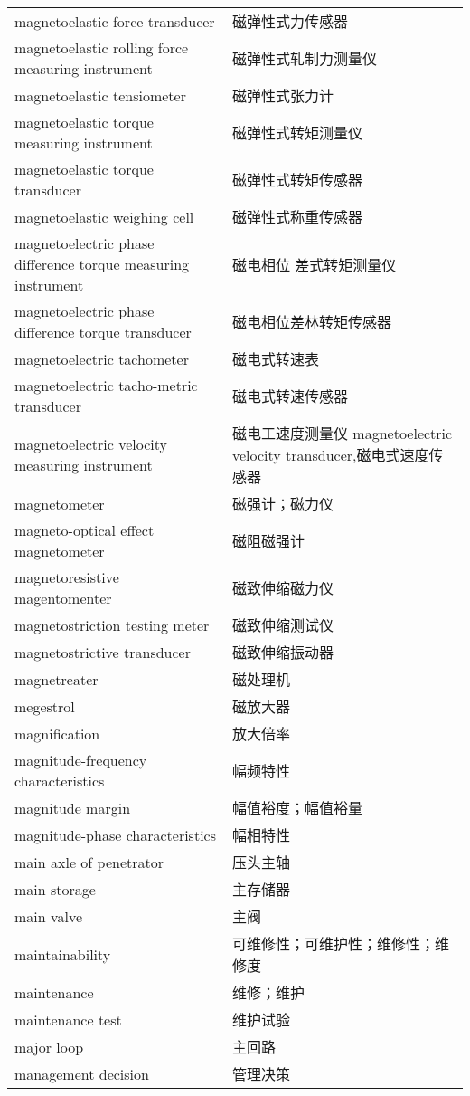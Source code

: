 \documentclass[
]{article}
\begin{document}
\begin{longtable}[]{@{}ll@{}}
magnetoelastic force transducer & 磁弹性式力传感器 \\
magnetoelastic rolling force measuring instrument &
磁弹性式轧制力测量仪 \\
magnetoelastic tensiometer & 磁弹性式张力计 \\
magnetoelastic torque measuring instrument & 磁弹性式转矩测量仪 \\
magnetoelastic torque transducer & 磁弹性式转矩传感器 \\
magnetoelastic weighing cell & 磁弹性式称重传感器 \\
magnetoelectric phase difference torque measuring instrument & 磁电相位
差式转矩测量仪 \\
magnetoelectric phase difference torque transducer &
磁电相位差林转矩传感器 \\
magnetoelectric tachometer & 磁电式转速表 \\
magnetoelectric tacho-metric transducer & 磁电式转速传感器 \\
magnetoelectric velocity measuring instrument & 磁电工速度测量仪
magnetoelectric velocity transducer,磁电式速度传感器 \\
magnetometer & 磁强计；磁力仪 \\
magneto-optical effect magnetometer & 磁阻磁强计 \\
magnetoresistive magentomenter & 磁致伸缩磁力仪 \\
magnetostriction testing meter & 磁致伸缩测试仪 \\
magnetostrictive transducer & 磁致伸缩振动器 \\
magnetreater & 磁处理机 \\
megestrol & 磁放大器 \\
magnification & 放大倍率 \\
magnitude-frequency characteristics & 幅频特性 \\
magnitude margin & 幅值裕度；幅值裕量 \\
magnitude-phase characteristics & 幅相特性 \\
main axle of penetrator & 压头主轴 \\
main storage & 主存储器 \\
main valve & 主阀 \\
maintainability & 可维修性；可维护性；维修性；维修度 \\
maintenance & 维修；维护 \\
maintenance test & 维护试验 \\
major loop & 主回路 \\
management decision & 管理决策 \\

\end{longtable}
\end{document}

